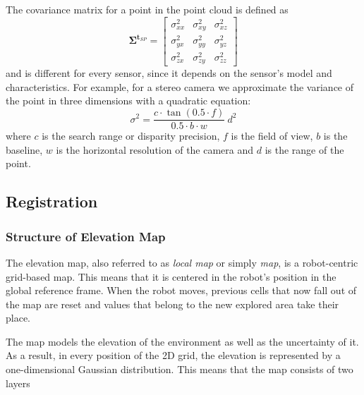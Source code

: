 \begin{enumerate}
        The covariance matrix for a point in the point cloud is defined as
        \begin{equation}
            \mathbf{\Sigma}^{\mathbf{t}_{SP}} =
            \begin{bmatrix}
                \sigma^2_{xx} & \sigma^2_{xy} & \sigma^2_{xz} \\
                \sigma^2_{yx} & \sigma^2_{yy} & \sigma^2_{yz} \\
                \sigma^2_{zx} & \sigma^2_{zy} & \sigma^2_{zz}
            \end{bmatrix}
        \end{equation}
        and is different for every sensor,
        since it depends on the sensor's model and characteristics.
        For example, for a stereo camera we approximate the variance of
        the point in three dimensions with a quadratic equation:
        \begin{equation}
            \sigma^2 =
            \frac{c \cdot \tan(0.5 \cdot f)}{0.5 \cdot b \cdot w} \ d^2
        \end{equation}
        where
        $c$ is the search range or disparity precision,
        $f$ is the field of view,
        $b$ is the baseline,
        $w$ is the horizontal resolution of the camera and
        $d$ is the range of the point.

\end{enumerate}


\subsection{Registration}

\subsubsection{Structure of Elevation Map} \label{map_structure}

The elevation map, also referred to as \textit{local map} or simply
\textit{map}, is a robot-centric grid-based map.
This means that it is centered in the robot's position in the
global reference frame.
When the robot moves, previous cells that now fall out of the map are
reset and values that belong to the new explored area take their place.

The map models the elevation of the environment as well as the uncertainty
of it.
As a result, in every position of the 2D grid, the elevation is
represented by a one-dimensional Gaussian distribution.
This means that the map consists of two layers

